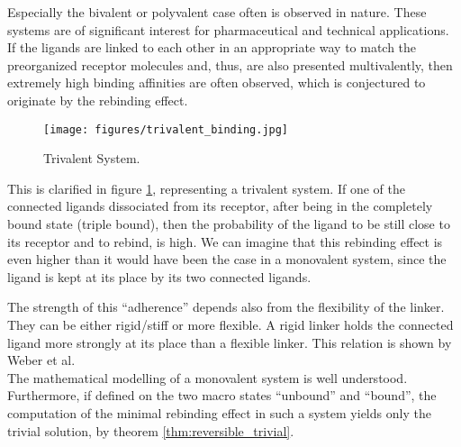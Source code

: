 Especially the bivalent or polyvalent case often is observed in nature. 
These systems are of significant interest for pharmaceutical and technical applications. If the ligands are linked to each other in an appropriate way to match the preorganized receptor molecules and, thus, are also presented multivalently, then extremely high binding affinities are often observed, which is conjectured to originate by the rebinding effect. %
\begin{figure}[!ht]
	\centering
	\texttt{[image: figures/trivalent\_binding.jpg]}
	\caption{Trivalent System.}
	\label{fig:trivalent}
\end{figure}
This is clarified in figure \ref{fig:trivalent}, representing a trivalent system. If one of the connected ligands dissociated from its receptor, after being in the completely bound state (triple bound), then the probability of the ligand to be still close to its receptor and to rebind, is high.
We can imagine that this rebinding effect is even higher than it would have been the case in a monovalent system, since the ligand is kept at its place by its two connected ligands.

The strength of this ``adherence'' depends also from the flexibility of the linker. They can be either rigid/stiff or more flexible. A rigid linker holds the connected ligand more strongly at its place than a flexible linker. This relation is shown by Weber et al\cite{weber2012}. 
\\

The mathematical modelling of a monovalent system is well understood. Furthermore, if defined on the two macro states ``unbound'' and ``bound'', the computation of the minimal rebinding effect in such a system yields only the trivial solution, by theorem \ref{thm:reversible_trivial}.

